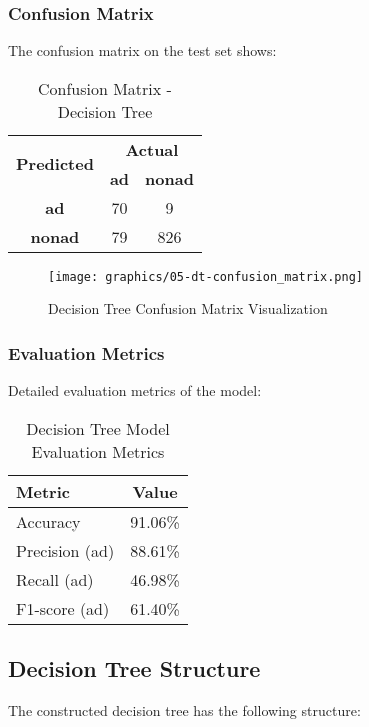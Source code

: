 \subsubsection{Confusion Matrix}

The confusion matrix on the test set shows:

\begin{table}[h]
\centering
\caption{Confusion Matrix - Decision Tree}
\begin{tabular}{|c|c|c|}
\hline
\multirow{2}{*}{\textbf{Predicted}} & \multicolumn{2}{c|}{\textbf{Actual}} \\
\cline{2-3}
 & \textbf{ad} & \textbf{nonad} \\
\hline
\textbf{ad} & 70 & 9 \\
\hline
\textbf{nonad} & 79 & 826 \\
\hline
\end{tabular}
\end{table}

\begin{figure}[h]
\centering
\texttt{[image: graphics/05-dt-confusion\_matrix.png]}
\caption{Decision Tree Confusion Matrix Visualization}
\end{figure}

\subsubsection{Evaluation Metrics}

Detailed evaluation metrics of the model:

\begin{table}[h]
\centering
\caption{Decision Tree Model Evaluation Metrics}
\begin{tabular}{|l|c|}
\hline
\textbf{Metric} & \textbf{Value} \\
\hline
Accuracy & 91.06\% \\
Precision (ad) & 88.61\% \\
Recall (ad) & 46.98\% \\
F1-score (ad) & 61.40\% \\
\hline
\end{tabular}
\end{table}

\subsection{Decision Tree Structure}

The constructed decision tree has the following structure:

